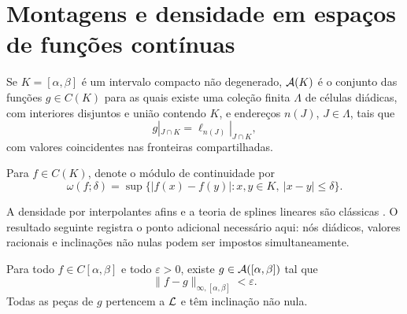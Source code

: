 \section{Montagens e densidade em espaços de funções contínuas}
\label{sec:assemblies}

\begin{definition}\label{def:assembly}
Se $K=[\alpha,\beta]$ é um intervalo compacto não degenerado, $\mathcal{A}(K)$ é o conjunto das funções $g\in C(K)$ para as quais existe uma coleção finita $\Lambda$ de células diádicas, com interiores disjuntos e união contendo $K$, e endereços $n(J)$, $J\in\Lambda$, tais que
\begin{equation}
 g|_{J\cap K}=\ell_{n(J)}|_{J\cap K},
 \label{eq:assembly}
\end{equation}
com valores coincidentes nas fronteiras compartilhadas.
\end{definition}

Para $f\in C(K)$, denote o módulo de continuidade por
\begin{equation}
 \omega(f;\delta)=\sup\{|f(x)-f(y)|:x,y\in K,\ |x-y|\le\delta\}.
\end{equation}

A densidade por interpolantes afins e a teoria de splines lineares são
clássicas \citep{deboor2001,powell1981,schumaker2007}. O resultado seguinte
registra o ponto adicional necessário aqui: nós diádicos, valores racionais e
inclinações não nulas podem ser impostos simultaneamente.

\begin{theorem}\label{thm:density}
Para todo $f\in C[\alpha,\beta]$ e todo $\varepsilon>0$, existe $g\in\mathcal{A}([\alpha,\beta])$ tal que
\[
 \|f-g\|_{\infty,[\alpha,\beta]}<\varepsilon.
\]
Todas as peças de $g$ pertencem a $\mathcal{L}$ e têm inclinação não nula.
\end{theorem}

